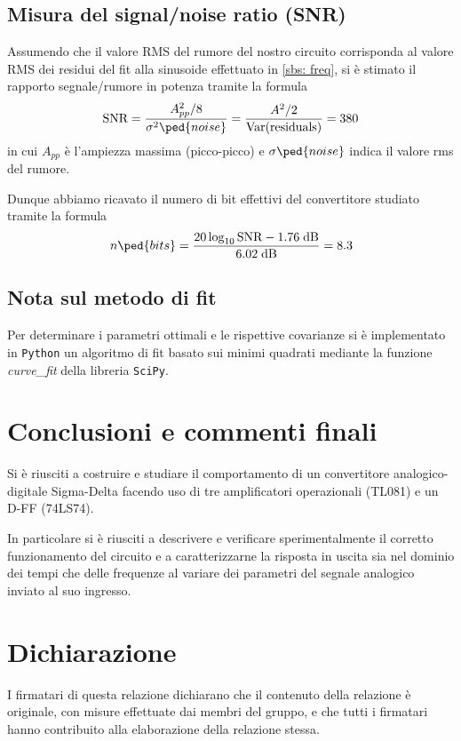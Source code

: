 \documentclass[10pt, a4paper, italian]{article}
\begin{document}
\subsection{Misura del signal/noise ratio (SNR)}
Assumendo che il valore RMS del rumore del nostro circuito corrisponda al
valore RMS dei residui del fit alla sinusoide effettuato in \cref{sbs: freq},
si è stimato il rapporto segnale/rumore in potenza tramite la formula
\begin{equation}\label{eq: SNR}
\text{SNR} = \frac{A_{pp}^2/8}{\sigma^2\ped{noise}} =
\frac{A^2/2}{\text{Var}(\text{residuals})} = 380
\end{equation}
in cui $A_{pp}$ è l'ampiezza massima (picco-picco) e $\sigma\ped{noise}$ indica
il valore rms del rumore.

Dunque abbiamo ricavato il numero di bit effettivi del convertitore studiato
tramite la formula
\begin{equation}\label{eq: effbit}
n\ped{bits} = \frac{20\log_{10}{\text{SNR}} - 1.76 \; \si{dB}}
{6.02 \; \si{dB}} = 8.3
\end{equation}

\subsection*{Nota sul metodo di fit}
Per determinare i parametri ottimali e le rispettive covarianze si \`e
implementato in \verb+Python+ un algoritmo di fit basato sui minimi quadrati
mediante la funzione \emph{curve\_fit} della libreria \texttt{SciPy}.

\section*{Conclusioni e commenti finali}
Si è riusciti a costruire e studiare il comportamento di un convertitore
analogico-digitale Sigma-Delta facendo uso di tre amplificatori
operazionali (TL081) e un D-FF (74LS74).

In particolare si è riusciti a descrivere e verificare sperimentalmente il
corretto funzionamento del circuito e a caratterizzarne la risposta in uscita
sia nel dominio dei tempi che delle frequenze al variare dei parametri del
segnale analogico inviato al suo ingresso.

\section*{Dichiarazione}
I firmatari di questa relazione dichiarano che il contenuto della relazione \`e
originale, con misure effettuate dai membri del gruppo, e che tutti i firmatari
hanno contribuito alla elaborazione della relazione stessa.
\end{document}
